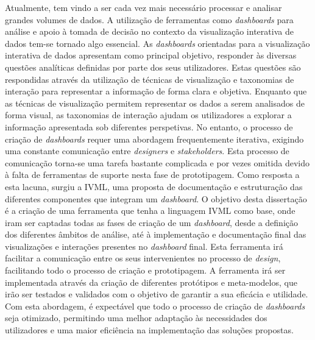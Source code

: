 
%

Atualmente, tem vindo a ser cada vez mais necessário processar e analisar grandes volumes de dados. A utilização de ferramentas como \textit{dashboards} para análise e apoio à tomada de decisão no contexto da visualização interativa de dados tem-se tornado algo essencial. As \textit{dashboards} orientadas para a visualização interativa de dados apresentam como principal objetivo, responder às diversas questões analíticas definidas por parte dos seus utilizadores. Estas questões são respondidas através da utilização de técnicas de visualização e taxonomias de interação para representar a informação de forma clara e objetiva. Enquanto que as técnicas de visualização permitem representar os dados a serem analisados de forma visual, as taxonomias de interação ajudam os utilizadores a explorar a informação apresentada sob diferentes perspetivas. No entanto, o processo de criação de \textit{dashboards} requer uma abordagem frequentemente iterativa, exigindo uma constante comunicação entre \textit{designers} e \textit{stakeholders}. Esta processo de comunicação torna-se uma tarefa bastante complicada e por vezes omitida devido à falta de ferramentas de suporte nesta fase de prototipagem. Como resposta a esta lacuna, surgiu a \gls{IVML}, uma proposta de documentação e estruturação das diferentes componentes que integram um \textit{dashboard}. O objetivo desta dissertação é a criação de uma ferramenta que tenha a linguagem \gls{IVML} como base, onde iram ser captadas todas as fases de criação de um \textit{dashboard}, desde a definição dos diferentes âmbitos de análise, até à implementação e documentação final das visualizações e interações presentes no \textit{dashboard} final. Esta ferramenta irá facilitar a comunicação entre os seus intervenientes no processo de \textit{design}, facilitando todo o processo de criação e prototipagem. A ferramenta irá ser implementada através da criação de diferentes protótipos e meta-modelos, que irão ser testados e validados com o objetivo de garantir a sua eficácia e utilidade. Com esta abordagem, é expectável que todo o processo de criação de \textit{dashboards} seja otimizado, permitindo uma melhor adaptação às necessidades dos utilizadores e uma maior eficiência na implementação das soluções propostas.

